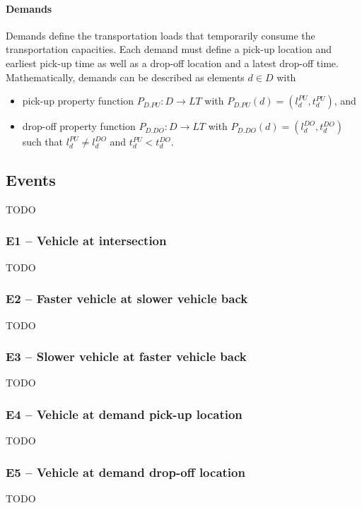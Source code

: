 \documentclass{article}
\begin{document}
    \paragraph{Demands}
    Demands define the transportation loads that temporarily consume the transportation capacities.
    Each demand must define a pick-up location and earliest pick-up time as well as a drop-off location and a latest drop-off time.
    Mathematically, demands can be described as elements $d \in D$ with
    \begin{itemize}
        \item pick-up property function $P_{D.PU}: D \rightarrow LT$ with $P_{D.PU}(d) = (l_d^{PU},t_d^{PU})$, and
        \item drop-off property function $P_{D.DO}: D \rightarrow LT$ with $P_{D.DO}(d) = (l_d^{DO},t_d^{DO})$ such that $l_d^{PU} \neq l_d^{DO}$ and $t_d^{PU} < t_d^{DO}$.
    \end{itemize}

    \subsection{Events}
    \label{sec:events}
    TODO

    \subsubsection{E1 -- Vehicle at intersection}
    TODO

    \subsubsection{E2 -- Faster vehicle at slower vehicle back}
    TODO

    \subsubsection{E3 -- Slower vehicle at faster vehicle back}
    TODO

    \subsubsection{E4 -- Vehicle at demand pick-up location}
    TODO

    \subsubsection{E5 -- Vehicle at demand drop-off location}
    TODO
\end{document}
